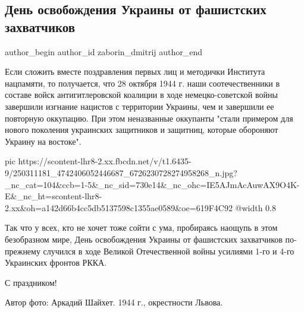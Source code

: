  
 
 
 
 
 
\subsection{День освобождения Украины от фашистских захватчиков}
\label{sec:28_10_2021.fb.zaborin_dmitrij.1.den_osvobozhdenia_ukrainy}
 
\ifcmt
 author_begin
   author_id zaborin_dmitrij
 author_end
\fi

Если сложить вместе поздравления первых лиц и методички Института нацпамяти, то
получается, что 28 октября 1944 г. наши соотечественники в составе войск
антигитлеровской коалиции в ходе немецко-советской войны завершили изгнание
нацистов с территории Украины, чем и завершили ее повторную оккупацию. При этом
неназванные оккупанты "стали примером для нового поколения украинских
защитников и защитниц, которые обороняют Украину на востоке". 

\ifcmt
  pic https://scontent-lhr8-2.xx.fbcdn.net/v/t1.6435-9/250311181_4742406052446687_6726230728274958268_n.jpg?_nc_cat=104&ccb=1-5&_nc_sid=730e14&_nc_ohc=IE5AJmAcAuwAX9O4K-E&_nc_ht=scontent-lhr8-2.xx&oh=a142d66b4cc5db5137598c1355ae0589&oe=619F4C92
  @width 0.8
\fi

Так что у всех, кто не хочет тоже сойти с ума, пробираясь наощупь в этом
безобразном мире, День освобождения Украины от фашистских захватчиков
по-прежнему случился в ходе Великой Отечественной войны усилиями 1-го и 4-го
Украинских фронтов РККА.

С праздником!

Автор фото: Аркадий Шайхет. 1944 г., окрестности Львова.

